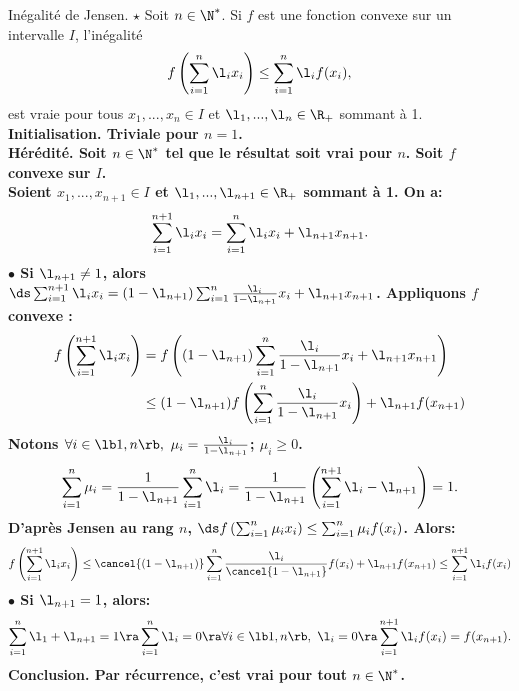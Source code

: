 \documentclass[11pt]{article}
\begin{document}
\begin{thm}{Inégalité de Jensen. $\star$}{}
    Soit $n\in\N^*$. Si $f$ est une fonction convexe sur un intervalle $I$, l'inégalité
    \begin{equation*}
        f\left( \sum_{i=1}^n\l_ix_i \right) \leq \sum_{i=1}^n\l_if(x_i),
    \end{equation*}
    est vraie pour tous $x_1,...,x_n\in I$ et $\l_1,...,\l_n\in\R_+$ sommant à 1.
    \tcblower
    \bf{Initialisation.} Triviale pour $n=1$.\\
    \bf{Hérédité.} Soit $n\in\N^*$ tel que le résultat soit vrai pour $n$. Soit $f$ convexe sur $I$.\\
    Soient $x_1,...,x_{n+1}\in I$ et $\l_1,...,\l_{n+1}\in\R_+$ sommant à 1. On a:
    \begin{equation*}
        \sum_{i=1}^{n+1}\l_ix_i = \sum_{i=1}^n\l_ix_i + \l_{n+1}x_{n+1}.
    \end{equation*}
    $\bullet$ Si $\l_{n+1}\neq1$, alors $\ds\sum_{i=1}^{n+1}\l_ix_i=(1-\l_{n+1})\sum_{i=1}^{n}\frac{\l_i}{1-\l_{n+1}}x_i + \l_{n+1}x_{n+1}$. Appliquons $f$ convexe :
    \begin{align*}
        f\left( \sum_{i=1}^{n+1}\l_ix_i \right) &= f\left( (1-\l_{n+1})\sum_{i=1}^n\frac{\l_i}{1-\l_{n+1}}x_i + \l_{n+1}x_{n+1} \right)\\
        &\leq (1-\l_{n+1})f\left( \sum_{i=1}^n\frac{\l_i}{1-\l_{n+1}}x_i \right) + \l_{n+1}f(x_{n+1})
    \end{align*}
    Notons $\forall i \in \lb1,n\rb, ~ \mu_i = \frac{\l_i}{1-\l_{n+1}}$; $\mu_i\geq0$.
    \begin{equation*}
        \sum_{i=1}^n\mu_i=\frac{1}{1-\l_{n+1}}\sum_{i=1}^n\l_i=\frac{1}{1-\l_{n+1}}\left( \sum_{i=1}^{n+1}\l_i - \l_{n+1} \right) = 1.
    \end{equation*}
    D'après Jensen au rang $n$, $\ds f\left( \sum_{i=1}^n\mu_ix_i \right)\leq\sum_{i=1}^n\mu_if(x_i)$. Alors:
    \begin{equation*}
        f\left( \sum_{i=1}^{n+1}\l_ix_i \right) \leq \cancel{(1-\l_{n+1})}\sum_{i=1}^n\frac{\l_i}{\cancel{1-\l_{n+1}}}f(x_i)+\l_{n+1}f(x_{n+1}) \leq \sum_{i=1}^{n+1}\l_if(x_i)
    \end{equation*}
    $\bullet$ Si $\l_{n+1}=1$, alors:
    \begin{equation*}
        \sum_{i=1}^n\l_1+\l_{n+1}=1\ra\sum_{i=1}^n\l_i = 0 \ra \forall i \in \lb1,n\rb, ~ \l_i=0\ra\sum_{i=1}^{n+1}\l_if(x_i)=f(x_{n+1}).
    \end{equation*}
    \bf{Conclusion.} Par récurrence, c'est vrai pour tout $n\in\N^*$.
\end{thm}
\end{document}

